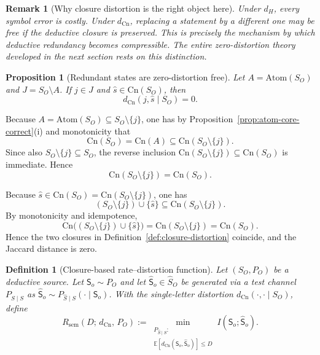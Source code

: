 \documentclass[journal,onecolumn]{IEEEtran}
\makeatletter
\newcommand{\Atom}{\text{Atom}}
\newcommand{\Cn}{\text{Cn}}
\newcommand{\E}{\mathbb{E}}
\newtheorem{proposition}{Proposition}[section]
\newtheorem{definition}{Definition}[section]
\newtheorem{remark}{Remark}[section]
\numberwithin{equation}{section}
\renewenvironment{proof}[1][\proofname]{\par
  \pushQED{\qed}%
  \normalfont \topsep6\p@\@plus6\p@\relax
  \trivlist
  \item[\hskip\labelsep
        \itshape
    #1\@addpunct{.}]\ignorespaces
}{%
  \popQED\endtrivlist\@endpefalse
}
\makeatother
\begin{document}
\begin{remark}[Why closure distortion is the right object here]
\label{rem:closure-distortion-content}
Under \(d_H\), every symbol error is costly.
Under \(d_{\Cn}\), replacing a statement by a different one may be
free if the deductive closure is preserved.
This is precisely the mechanism by which deductive redundancy
becomes compressible.
The entire zero-distortion theory developed in the next section
rests on this distinction.
\end{remark}

\begin{proposition}[Redundant states are zero-distortion free]
\label{prop:redundant-free}
Let \(A=\Atom(S_O)\) and \(J=S_O\setminus A\).
If \(j\in J\) and \(\hat s\in\Cn(S_O)\), then
\[
  d_{\Cn}(j,\hat s\mid S_O)=0.
\]
\end{proposition}

\begin{proof}
Because \(A=\Atom(S_O)\subseteq S_O\setminus\{j\}\), one has by
Proposition~\ref{prop:atom-core-correct}(i) and monotonicity that
\[
  \Cn(S_O)
  =
  \Cn(A)
  \subseteq
  \Cn(S_O\setminus\{j\}).
\]
Since also \(S_O\setminus\{j\}\subseteq S_O\), the reverse inclusion
\(\Cn(S_O\setminus\{j\})\subseteq \Cn(S_O)\) is immediate.
Hence
\[
  \Cn(S_O\setminus\{j\})=\Cn(S_O).
\]

Because \(\hat s\in\Cn(S_O)=\Cn(S_O\setminus\{j\})\), one has
\[
  (S_O\setminus\{j\})\cup\{\hat s\}
  \subseteq
  \Cn(S_O\setminus\{j\}).
\]
By monotonicity and idempotence,
\[
  \Cn\bigl((S_O\setminus\{j\})\cup\{\hat s\}\bigr)
  =
  \Cn(S_O\setminus\{j\})
  =
  \Cn(S_O).
\]
Hence the two closures in
Definition~\ref{def:closure-distortion} coincide, and the
Jaccard distance is zero.
\end{proof}

\begin{definition}[Closure-based rate--distortion function]
\label{def:semantic-rd}
Let \((S_O,P_O)\) be a deductive source. Let \(\mathsf{S}_o\sim P_O\) and let
\(\hat{\mathsf{S}}_o\in \hat S_O\) be generated via a test channel
\(P_{\hat S\mid S}\) as \(\hat{\mathsf{S}}_o\sim P_{\hat S\mid S}(\cdot\mid \mathsf{S}_o)\).
With the single-letter distortion \(d_{\Cn}(\cdot,\cdot\mid S_O)\), define
\begin{equation}\label{eq:R-sem-D}
  R_{\mathrm{sem}}(D;\,d_{\Cn},\,P_O)
  :=
  \min_{\substack{P_{\hat S\mid S}:\\
  \E[d_{\Cn}(\mathsf{S}_o,\hat{\mathsf{S}}_o)]\le D}}
  I(\mathsf{S}_o;\hat{\mathsf{S}}_o).
\end{equation}
\end{definition}
\end{document}

